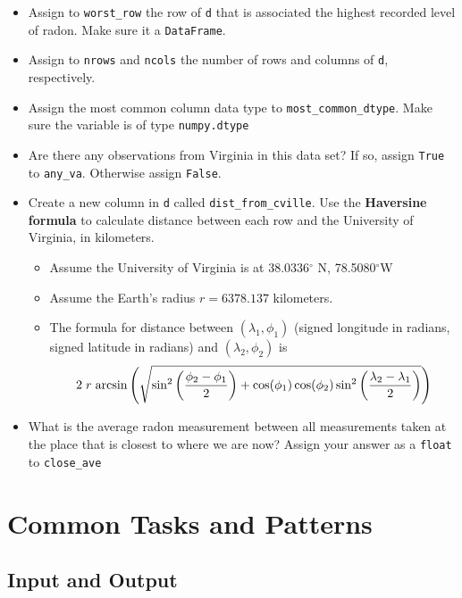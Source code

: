 \documentclass[
  12pt,
  krantz2]{krantz}
\providecommand{\tightlist}{%
  \setlength{\itemsep}{0pt}\setlength{\parskip}{0pt}}
\begin{document}
\begin{itemize}
\tightlist
\item
  Assign to \texttt{worst\_row} the row of \texttt{d} that is associated the highest recorded level of radon. Make sure it a \texttt{DataFrame}.
\item
  Assign to \texttt{nrows} and \texttt{ncols} the number of rows and columns of \texttt{d}, respectively.
\item
  Assign the most common column data type to \texttt{most\_common\_dtype}. Make sure the variable is of type \texttt{numpy.dtype}
\item
  Are there any observations from Virginia in this data set? If so, assign \texttt{True} to \texttt{any\_va}. Otherwise assign \texttt{False}.
\item
  Create a new column in \texttt{d} called \texttt{dist\_from\_cville}. Use the \textbf{Haversine formula} to calculate distance between each row and the University of Virginia, in kilometers.

  \begin{itemize}
  \tightlist
  \item
    Assume the University of Virginia is at 38.0336\(^\circ\) N, 78.5080\(^\circ\)W
  \item
    Assume the Earth's radius \(r = 6378.137\) kilometers.
  \item
    The formula for distance between \((\lambda_1, \phi_1)\) (signed longitude in radians, signed latitude in radians) and \((\lambda_2, \phi_2)\) is \[2 \hspace{1mm} r \hspace{1mm} \text{arcsin}\left( \sqrt{ \sin^2\left( \frac{\phi_2 - \phi_1}{2}\right)  + \cos(\phi_1)\cos(\phi_2) \sin^2\left( \frac{\lambda_2 - \lambda_1}{2} \right)  } \right)\]
  \end{itemize}
\item
  What is the average radon measurement between all measurements taken at the place that is closest to where we are now? Assign your answer as a \texttt{float} to \texttt{close\_ave}
\end{itemize}

\hypertarget{part-common-tasks-and-patterns}{%
\part{Common Tasks and Patterns}\label{part-common-tasks-and-patterns}}

\hypertarget{input-and-output}{%
\chapter{Input and Output}\label{input-and-output}}
\end{document}

